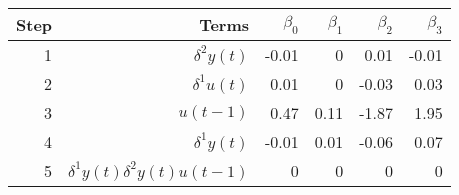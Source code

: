 \begin{tabular}{rrrrrr}
Step & Terms & $\beta_{0}$ & $\beta_{1}$ & $\beta_{2}$ & $\beta_{3}$ \\ 
\hline 
1 & $\delta^2 y(t)$ & -0.01 & 0 & 0.01 & -0.01 \\ 
2 & $\delta^1 u(t)$ & 0.01 & 0 & -0.03 & 0.03 \\ 
3 & $u(t-1)$ & 0.47 & 0.11 & -1.87 & 1.95 \\ 
4 & $\delta^1 y(t)$ & -0.01 & 0.01 & -0.06 & 0.07 \\ 
5 & $\delta^1 y(t)\delta^2 y(t)u(t-1)$ & 0 & 0 & 0 & 0 \\ 
\hline 
\end{tabular}